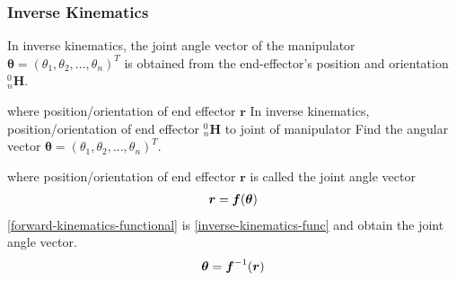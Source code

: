 

\subsubsection{Inverse Kinematics}
In inverse kinematics, the joint angle vector of the manipulator $\bm{\theta}=(\theta_1, \theta_2, ..., \theta_n)^T$ is obtained from the end-effector's position and orientation $^0_n\bm{H}$.


where position/orientation %
of end effector %
$\bm{r}$ In inverse kinematics, position/orientation of end effector $^0_n\bm{H}$ to joint of manipulator Find the angular vector $\bm{\theta}=(\theta_1, \theta_2, ..., \theta_n)^T$.


where position/orientation %
of end effector %
$\bm{r}$
is called the joint angle vector
\begin{eqnarray}
  \bm{r} = \bm{f}(\bm{\theta}) \eqlabel{forward-kinematics-functional}
\end{eqnarray}
\eqref{forward-kinematics-functional} is \eqref{inverse-kinematics-func}
and obtain the joint angle vector.
\begin{eqnarray}
  \bm{\theta} = \bm{f}^{-1}(\bm{r}) \eqlabel{inverse-kinematics-func}
\end{eqnarray}

